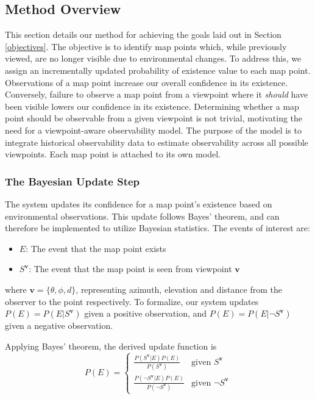 \subsection{Method Overview}

This section details our method for achieving the goals laid out in Section \ref{objectives}. The objective is to identify map points which, while previously viewed, are no longer visible due to environmental changes. To address this, we assign an incrementally updated probability of existence value to each map point. Observations of a map point increase our overall confidence in its existence. Conversely, failure to observe a map point from a viewpoint where it \textit{should} have been visible lowers our confidence in its existence. Determining whether a map point should be observable from a given viewpoint is not trivial, motivating the need for a viewpoint-aware observability model. The purpose of the model is to integrate historical observability data to estimate observability across all possible viewpoints. Each map point is attached to its own model.

\subsubsection{The Bayesian Update Step}

The system updates its confidence for a map point's existence based on environmental observations. This update follows Bayes' theorem, and can therefore be implemented to utilize Bayesian statistics. The events of interest are:
\begin{itemize}
  \item $E$: The event that the map point exists
  \item $S^{\boldsymbol{v}}$: The event that the map point is seen from viewpoint $\boldsymbol{v}$
\end{itemize}

where $\boldsymbol{v} = \{\theta,\phi,d\}$, representing azimuth, elevation and distance from the observer to the point respectively. To formalize, our system updates $P(E) = P(E|S^{\boldsymbol{v}})$ given a positive observation, and $P(E) = P(E|\neg S^{\boldsymbol{v}})$ given a negative observation.

Applying Bayes' theorem, the derived update function is
\[
  P(E) = \begin{cases}
    \frac{P(S^{\boldsymbol{v}}|E)P(E)}{P(S^{\boldsymbol{v}})}           & \text{given }S^{\boldsymbol{v}}      \\
    \frac{P(\neg S^{\boldsymbol{v}}|E)P(E)}{P(\neg S^{\boldsymbol{v}})} & \text{given }\neg S^{\boldsymbol{v}}
  \end{cases}
\]

